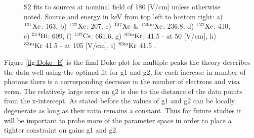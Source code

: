 \begin{figure}[h!]
\bigskip

\hfill
{}
\hfill
{}

\caption{S2 fits to sources at nominal field of 180 [V/cm] unless otherwise noted. Source and energy in keV from top left to bottom right: a) $\rm ^{131}Xe$: 163, b) $\rm ^{127}Xe$:  207, c) $\rm ^{127}Xe$ \&  $\rm ^{129m}Xe$: 236.8, d)  $\rm ^{127}Xe$: 410, e) $\rm ^{214}Bi$: 609, f) $\rm ^{137}Cs$: 661.6, g) $\rm ^{83m}Kr$: 41.5 - at 50 [V/cm], h) $\rm ^{83m}Kr$ 41.5 - at 105 [V/cm], i) $\rm ^{83m}Kr$ 41.5 .}
\label{fig:Doke_Fits_S2}
\end{figure}



Figure \ref{fig:Doke_E} is the final Doke plot for multiple peaks the theory describes the data well using the optimal fit for g1 and g2, for each increase in number of photons there is a corresponding decrease in the number of electrons and visa versa. The relatively large error on g2 is due to the distance of the data points from the x-intercept. As stated before the values of g1 and g2 can be locally degenerate as long as their ratio remains a constant. Thus for future studies it will be important to probe more of the parameter space in order to place a tighter constraint on gains g1 and g2.


